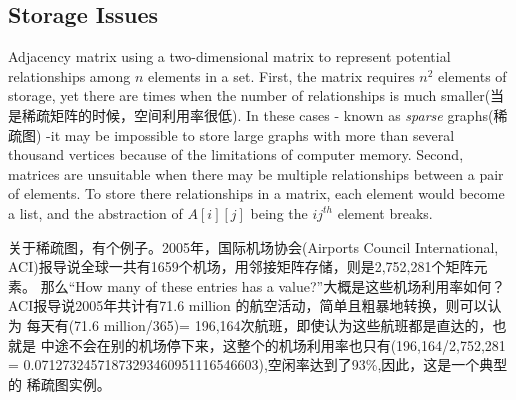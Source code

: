 \subsection{Storage Issues}
Adjacency matrix using a two-dimensional matrix to represent potential 
relationships among $n$ elements in a set. First, the matrix requires
$n^2$ elements of storage, yet there are times when the number of 
relationships is much smaller(当是稀疏矩阵的时候，空间利用率很低).
In these cases \-- known as \textit{sparse} graphs(稀疏图) \--it may be
impossible to store large graphs with more than several thousand vertices
because of the limitations of computer memory. 
Second, matrices are unsuitable when there may be multiple relationships
between a pair of elements. To store there relationships in a matrix,
each element would become a list, and the abstraction of $A[i][j]$ being
the $ij^{th}$ element breaks.

关于稀疏图，有个例子。2005年，国际机场协会(Airports Council International,
ACI)报导说全球一共有1659个机场，用邻接矩阵存储，则是2,752,281个矩阵元素。
那么“How many of these entries has a value?”大概是这些机场利用率如何？
ACI报导说2005年共计有71.6 million 的航空活动，简单且粗暴地转换，则可以认为
每天有(71.6 million/365)= 196,164次航班，即使认为这些航班都是直达的，也就是
中途不会在别的机场停下来，这整个的机场利用率也只有(196,164/2,752,281 = 0.07127324571873293460951116546603),空闲率达到了93\%,因此，这是一个典型的
稀疏图实例。


